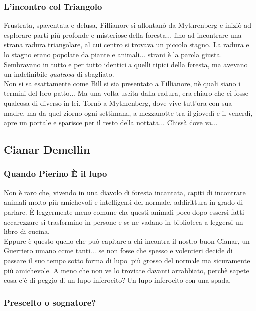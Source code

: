 \subsubsection{L'incontro col Triangolo}

Frustrata, spaventata e delusa, Fillianore si allontanò da Mythrenberg e iniziò ad esplorare parti più profonde e misteriose della foresta... fino ad incontrare una strana radura triangolare, al cui centro si trovava un piccolo stagno. La radura e lo stagno erano popolate da piante e animali... strani è la parola giusta. Sembravano in tutto e per tutto identici a quelli tipici della foresta, ma avevano un indefinibile \textit{qualcosa} di sbagliato. \\ Non si sa esattamente come Bill si sia presentato a Fillianore, nè quali siano i termini del loro patto... Ma una volta uscita dalla radura, era chiaro che ci fosse qualcosa di diverso in lei. Tornò a Mythrenberg, dove vive tutt'ora con sua madre, ma da quel giorno ogni settimana, a mezzanotte tra il giovedì e il venerdì, apre un portale e sparisce per il resto della nottata... Chissà dove va...

\subsection{Cianar Demellin}

\subsubsection{Quando Pierino È il lupo}

Non è raro che, vivendo in una diavolo di foresta incantata, capiti di incontrare animali molto più amichevoli e intelligenti del normale, addirittura in grado di parlare. È leggermente meno comune che questi animali poco dopo essersi fatti accarezzare si trasformino in persone e se ne vadano in biblioteca a leggersi un libro di cucina.\\
Eppure è questo quello che può capitare a chi incontra il nostro buon Cianar, un Guerriero umano come tanti... se non fosse che spesso e volentieri decide di passare il suo tempo sotto forma di lupo, più grosso del normale ma sicuramente più amichevole. A meno che non ve lo troviate davanti arrabbiato, perchè sapete cosa c'è di peggio di un lupo inferocito? Un lupo inferocito con una spada.

\subsubsection{Prescelto o sognatore?}

